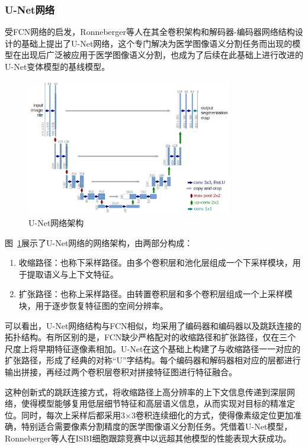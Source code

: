 \subsubsection{U-Net网络}

受FCN网络的启发，Ronneberger等人在其全卷积架构和解码器-编码器网络结构设计的基础上提出了U-Net网络，这个专门解决为医学图像语义分割任务而出现的模型在出现后广泛被应用于医学图像语义分割，也成为了后续在此基础上进行改进的U-Net变体模型的基线模型。

\begin{figure}[htbp]
    \centering
    \includegraphics[width=0.8\textwidth]{fig/u-net-architecture.png}
    \caption{U-Net网络架构\cite{ronneberger2015}}
    \label{fig:unet_frame}
\end{figure}

图~\ref{fig:unet_frame}展示了U-Net网络的网络架构，由两部分构成：

\begin{enumerate}
    \item 收缩路径：也称下采样路径。由多个卷积层和池化层组成一个下采样模块，用于提取语义与上下文特征。
    \item 扩张路径：也称上采样路径。由转置卷积层和多个卷积层组成一个上采样模块，用于逐步恢复特征图的空间分辨率。
\end{enumerate}

可以看出，U-Net网络结构与FCN相似，均采用了编码器和编码器以及跳跃连接的拓扑结构。有所区别的是，FCN缺少严格配对的收缩路径和扩张路径，仅在三个尺度上将早期特征逐像素相加。U-Net在这个基础上构建了与收缩路径一一对应的扩张路径，形成了经典的对称“U”字结构。每个编码器和解码器相对应的层都进行输出拼接，再经过两个卷积层卷积对拼接特征图进行特征融合。

这种创新式的跳跃连接方式，将收缩路径上高分辨率的上下文信息传递到深层网络，使得模型能够复用低层细节特征和高层语义信息，从而实现对目标的精准定位。同时，每次上采样后都采用3×3卷积连续细化的方式，使得像素级定位更加准确，特别适合需要像素分割精度的医学图像语义分割任务。凭借着U-Net模型，Ronneberger等人在ISBI细胞跟踪竞赛中以远超其他模型的性能表现大获成功\cite{ronneberger2015}。